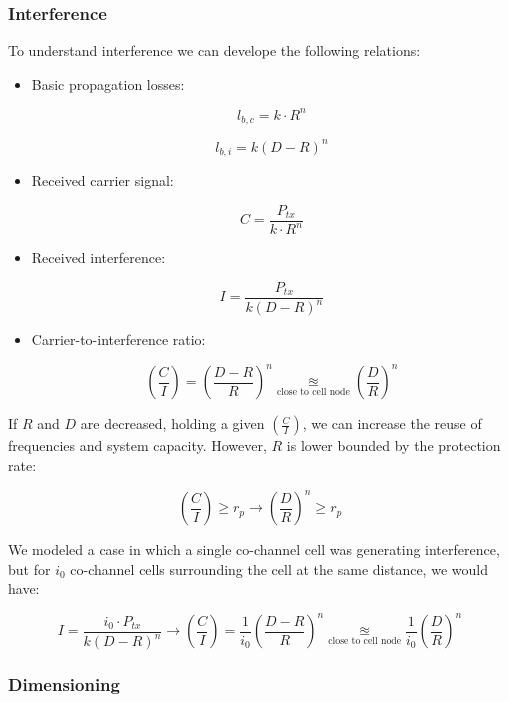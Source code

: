 \documentclass[../main.tex]{subfiles}
\begin{document}
\subsubsection{Interference}

To understand interference we can develope the following relations:

\begin{itemize}
	\item {
		Basic propagation losses:

		$$l_{b, c} = k \cdot R^n$$

		$$l_{b, i} = k (D - R)^n$$
	}
	\item {
		Received carrier signal:

		$$C = \frac {P_{tx}} {k \cdot R^n}$$
	}
	\item {
		Received interference:

		$$I = \frac {P_{tx}} {k (D - R)^n}$$
	}
	\item {
		Carrier-to-interference ratio:

		$$
			\left( \frac{C}{I} \right) = \left( \frac {D - R} {R} \right)^n \underset{\text{close to cell node}}{\approxeq} \left( \frac {D} {R} \right)^n
		$$
	}
\end{itemize}

If $R$ and $D$ are decreased, holding a given $\left( \frac{C}{I} \right)$, we can increase the reuse of frequencies and system capacity. However, $R$ is lower bounded by the protection rate:

$$
	\left( \frac{C}{I} \right) \ge r_p \rightarrow \left( \frac {D} {R} \right)^n \ge r_p
$$

We modeled a case in which a single co-channel cell was generating interference, but for $i_0$ co-channel cells surrounding the cell at the same distance, we would have:

$$
	I = \frac {i_0 \cdot P_{tx}} {k (D - R)^n} \rightarrow \left( \frac{C}{I} \right) = \frac{1}{i_0} \left( \frac {D - R} {R} \right)^n \underset{\text{close to cell node}}{\approxeq} \frac{1}{i_0} \left( \frac {D} {R} \right)^n
$$

\subsubsection{Dimensioning}
\end{document}
